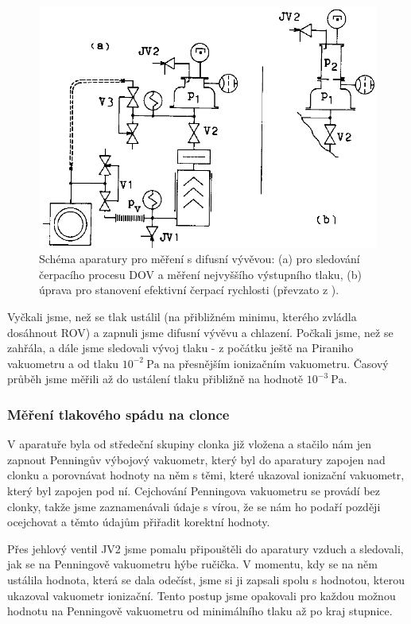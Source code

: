 \documentclass[english]{article}
\newcommand{\unit}[1]{~\mathrm{#1}}
\begin{document}
			\begin{figure}[h!]
			\centering
					\includegraphics[width=13cm]{../att/schemata.png}
					\caption{Schéma aparatury pro měření s difusní vývěvou: (a) pro sledování čerpacího procesu DOV a měření nejvyššího výstupního tlaku, (b) úprava pro stanovení efektivní čerpací rychlosti (převzato z \cite{bib:praskripta}).}
					\label{fig:schema}
			\end{figure}
		
		Vyčkali jsme, než se tlak ustálil (na přibližném minimu, kterého zvládla dosáhnout ROV) a zapnuli jsme difusní vývěvu a chlazení. Počkali jsme, než se zahřála, a dále jsme sledovali vývoj tlaku - z počátku ještě na Piraniho vakuometru a od tlaku $10^{-2}\unit{Pa}$ na přesnějším ionizačním vakuometru. Časový průběh jsme měřili až do ustálení tlaku přibližně na hodnotě $10^{-3}\unit{Pa}$.
		
	\subsubsection{Měření tlakového spádu na clonce}
		V aparatuře byla od středeční skupiny clonka již vložena a stačilo nám jen zapnout Penningův výbojový vakuometr, který byl do aparatury zapojen nad clonku a porovnávat hodnoty na něm s těmi, které ukazoval ionizační vakuometr, který byl zapojen pod ní. Cejchování Penningova vakuometru se provádí bez clonky, takže jsme zaznamenávali údaje s vírou, že se nám ho podaří později ocejchovat a těmto údajům přiřadit korektní hodnoty. 
		
		Přes jehlový ventil JV2 jsme pomalu připouštěli do aparatury vzduch a sledovali, jak se na Penningově vakuometru hýbe ručička. V momentu, kdy se na něm ustálila hodnota, která se dala odečíst, jsme si ji zapsali spolu s hodnotou, kterou ukazoval vakuometr ionizační. Tento postup jsme opakovali pro každou možnou hodnotu na Penningově vakuometru od minimálního tlaku až po kraj stupnice.
		
\end{document}

